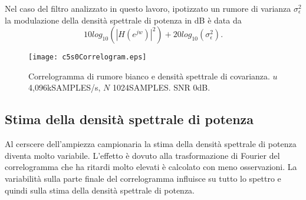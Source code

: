 Nel caso del filtro analizzato in questo lavoro, ipotizzato un rumore di varianza $\sigma_{\epsilon}^{2}$ la modulazione della densità spettrale di potenza in dB è data da
\begin{equation}
10log_{10}(|H(e^{jw})|^2) + 20log_{10}(\sigma_{\epsilon}^{2}).
\end{equation}

\begin{figure}[tbp] 
\centering    
\texttt{[image: c5s0Correlogram.eps]}
\caption[Correlogramma di rumore bianco e densità spettrale di covarianza]
{ Correlogramma di rumore bianco e densità spettrale di covarianza. $
u$ 4,096kSAMPLES/s, $N$ 1024SAMPLES. SNR 0dB.}
\label{fig:Correlogram}
\end{figure}

\subsection{Stima della densità spettrale di potenza}

Al cerscere dell'ampiezza campionaria la stima della densità spettrale di potenza diventa molto variabile. L'effetto è dovuto alla trasformazione di Fourier del correlogramma che ha ritardi molto elevati è calcolato con meno osservazioni. La variabilità sulla parte finale del correlogramma influisce su tutto lo spettro e quindi sulla stima della densità spettrale di potenza.
